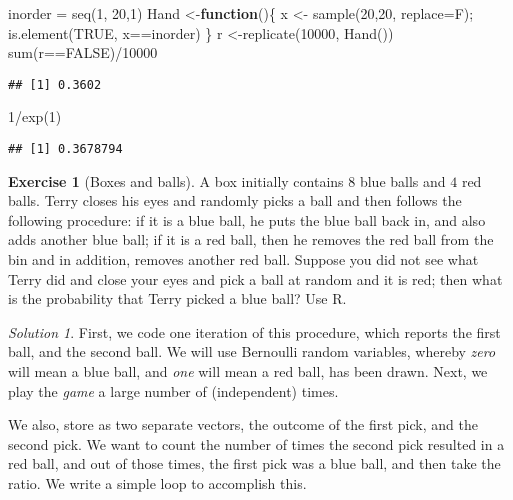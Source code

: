 \documentclass[
]{article}
\newenvironment{Shaded}{\begin{snugshade}}{\end{snugshade}}
\newcommand{\AttributeTok}[1]{\textcolor[rgb]{0.77,0.63,0.00}{#1}}
\newcommand{\ConstantTok}[1]{\textcolor[rgb]{0.00,0.00,0.00}{#1}}
\newcommand{\ControlFlowTok}[1]{\textcolor[rgb]{0.13,0.29,0.53}{\textbf{#1}}}
\newcommand{\DecValTok}[1]{\textcolor[rgb]{0.00,0.00,0.81}{#1}}
\newcommand{\FunctionTok}[1]{\textcolor[rgb]{0.00,0.00,0.00}{#1}}
\newcommand{\NormalTok}[1]{#1}
\newcommand{\OtherTok}[1]{\textcolor[rgb]{0.56,0.35,0.01}{#1}}
\newcommand{\SpecialCharTok}[1]{\textcolor[rgb]{0.00,0.00,0.00}{#1}}
\theoremstyle{definition}
\theoremstyle{definition}
\theoremstyle{definition}
\newtheorem{exercise}{Exercise}[section]
\theoremstyle{remark}
\newtheorem*{solution}{Solution}
\begin{document}
\begin{Shaded}
\begin{Highlighting}[]
\NormalTok{inorder }\OtherTok{=} \FunctionTok{seq}\NormalTok{(}\DecValTok{1}\NormalTok{, }\DecValTok{20}\NormalTok{,}\DecValTok{1}\NormalTok{)}
\NormalTok{Hand }\OtherTok{\textless{}{-}}\ControlFlowTok{function}\NormalTok{()\{}
\NormalTok{x }\OtherTok{\textless{}{-}} \FunctionTok{sample}\NormalTok{(}\DecValTok{20}\NormalTok{,}\DecValTok{20}\NormalTok{, }\AttributeTok{replace=}\NormalTok{F);}
\FunctionTok{is.element}\NormalTok{(}\ConstantTok{TRUE}\NormalTok{, x}\SpecialCharTok{==}\NormalTok{inorder)}
\NormalTok{\}}
\NormalTok{r }\OtherTok{\textless{}{-}}\FunctionTok{replicate}\NormalTok{(}\DecValTok{10000}\NormalTok{, }\FunctionTok{Hand}\NormalTok{())}
\FunctionTok{sum}\NormalTok{(r}\SpecialCharTok{==}\ConstantTok{FALSE}\NormalTok{)}\SpecialCharTok{/}\DecValTok{10000}
\end{Highlighting}
\end{Shaded}

\begin{verbatim}
## [1] 0.3602
\end{verbatim}

\begin{Shaded}
\begin{Highlighting}[]
\DecValTok{1}\SpecialCharTok{/}\FunctionTok{exp}\NormalTok{(}\DecValTok{1}\NormalTok{)}
\end{Highlighting}
\end{Shaded}

\begin{verbatim}
## [1] 0.3678794
\end{verbatim}

\begin{exercise}[Boxes and balls]
\protect\hypertarget{exr:unnamed-chunk-12}{}{\label{exr:unnamed-chunk-12} \iffalse (Boxes and balls) \fi{} } A box initially contains \(8\) blue balls and \(4\) red balls. Terry closes his eyes and randomly picks a ball and then follows the following procedure: if it is a blue ball, he puts the blue ball back in, and also adds another blue ball; if it is a red ball, then he removes the red ball from the bin and in addition, removes another red ball. Suppose you did not see what Terry did and close your eyes and pick a ball at random and it is red; then what is the probability that Terry picked a blue ball? Use R.\\
\end{exercise}
\begin{solution}
\iffalse{} {Solution. } \fi{}First, we code one iteration of this procedure, which reports the first ball, and the second ball. We will use Bernoulli random variables, whereby \emph{zero} will mean a blue ball, and \emph{one} will mean a red ball, has been drawn.
Next, we play the \emph{game} a large number of (independent) times.

We also, store as two separate vectors, the outcome of the first pick, and the second pick. We want to count the number of times the second pick resulted in a red ball, and out of those times, the first pick was a blue ball, and then take the ratio. We write a simple loop to accomplish this.
\end{solution}
\end{document}
